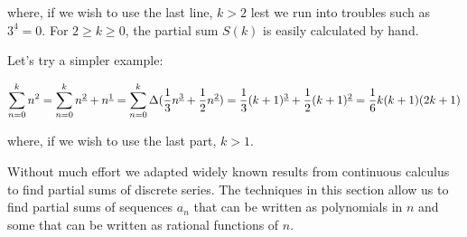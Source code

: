 \documentclass{article}
\begin{document}
\noindent where, if we wish to use the last line, $k > 2$ lest we run into
troubles such as $3^{\underline{4}}=0$. For $2 \geq k \geq 0$, the partial sum
$S(k)$ is easily calculated by hand.

Let's try a simpler example:

\[
    \sum\limits_{n=0}^k n^2 \\
    =\sum\limits_{n=0}^k n^{\underline{2}}+n^{\underline{1}} \\
    =\sum\limits_{n=0}^k \Delta (\frac{1}{3}n^{\underline{3}}+\frac{1}{2}n^{\underline{2}}) \\
    =\frac{1}{3}(k+1)^{\underline{3}}+\frac{1}{2}(k+1)^{\underline{2}} \\
    =\frac{1}{6}k(k+1)(2k+1)
\]

\noindent where, if we wish to use the last part, $k > 1$.

Without much effort we adapted widely known results from continuous calculus to
find partial sums of discrete series. The techniques in this section allow us
to find partial sums of sequences $a_n$ that can be written as polynomials in
$n$ and some that can be written as rational functions of $n$.
\end{document}
